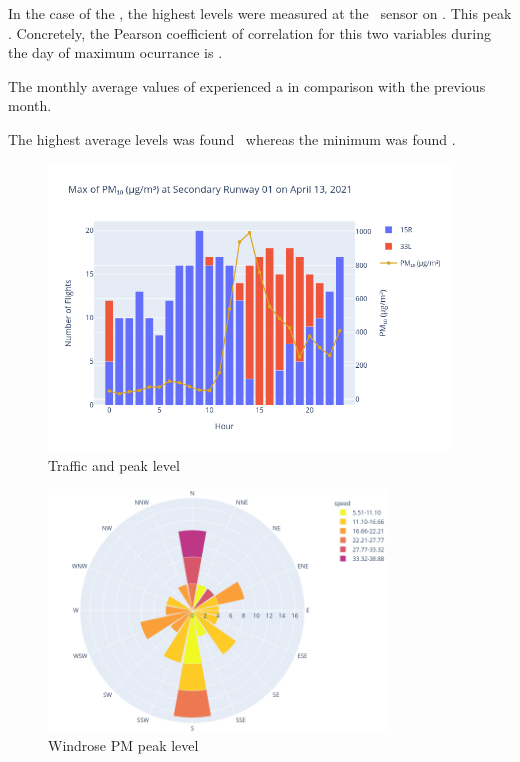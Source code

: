 \documentclass[12pt, oneside]{book}
\begin{document}
In the case of the , the highest levels were measured at the \stationMaxPMten\ sensor on \dayMaxPMten . This peak \relTrafficMaxPMten .  Concretely, the Pearson coefficient of correlation for this two variables during the day of maximum ocurrance is \correlPMten .

The monthly average values of  experienced a \monthChangePMten in comparison with the previous month.


The highest average  levels was found \maxDailyPMten\ whereas the minimum was found \minDailyPMten .


{\begin{figure}[H]
\centering
\includegraphics[width=0.95\textwidth, keepaspectratio]{image15}
\caption{Traffic and  peak level}\label{image15}
\end{figure}}{}


{\begin{figure}[H]
\centering
\includegraphics[width=0.8\textwidth, keepaspectratio]{windrosePM₁₀}
\caption{Windrose PM peak level}\label{windrosePM10}
\end{figure}}{}
\end{document}
